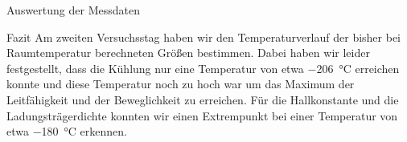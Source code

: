 \documentclass[pdftex, a4paper,11pt, twoside, ngerman]{report}
\begin{document}
\begin{chapter}{Auswertung der Messdaten}
\begin{section}{Fazit}
      Am zweiten Versuchsstag haben wir den Temperaturverlauf der bisher bei
      Raumtemperatur berechneten Größen bestimmen.
      Dabei haben wir leider festgestellt, dass die Kühlung nur eine Temperatur
      von etwa \SI{-206}{\celsius} erreichen konnte und diese Temperatur noch
      zu hoch war um das Maximum der Leitfähigkeit und der Beweglichkeit
      zu erreichen.
      Für die Hallkonstante und die Ladungsträgerdichte konnten wir einen
      Extrempunkt bei einer Temperatur von etwa \SI{-180}{\celsius}
      erkennen.
      
    \end{section}
    
  \end{chapter}
  
  
  
%   
  
  
  
  \begin{thebibliography}{99}
    \scriptsize
    
  \end{thebibliography}
 
\end{document}
